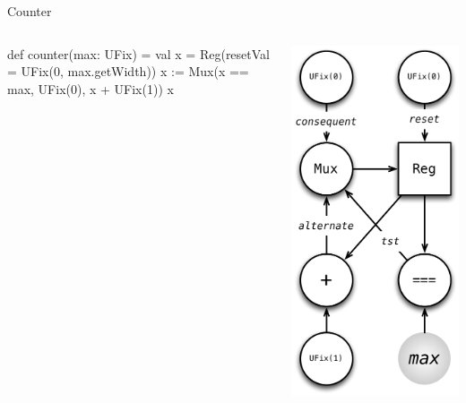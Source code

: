 \documentclass[xcolor=pdflatex,dvipsnames,table]{beamer}
\begin{document}
\begin{frame}[fragile]{Counter}

\begin{columns}

\begin{scala}
def counter(max: UFix) = {
  val x = Reg(resetVal = UFix(0, max.getWidth))
  x := Mux(x == max, UFix(0), x + UFix(1))
  x
}
\end{scala}


\begin{center}
\includegraphics[height=0.9\textheight]{figs/counter.pdf} 
\end{center}

\end{columns}

\end{frame}
\end{document}
